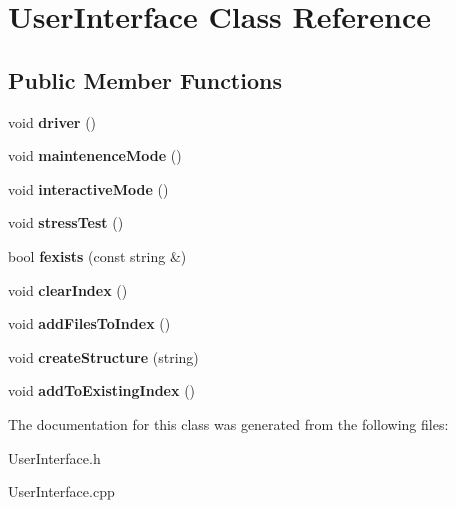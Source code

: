 \hypertarget{class_user_interface}{\section{User\+Interface Class Reference}
\label{class_user_interface}
}
\subsection*{Public Member Functions}
\begin{DoxyCompactItemize}
\item 
\hypertarget{class_user_interface_a5f668ba7e20441556650a2ab57919eb8}{void {\bfseries driver} ()}\label{class_user_interface_a5f668ba7e20441556650a2ab57919eb8}

\item 
\hypertarget{class_user_interface_aef424faaaab1a26e7e95615953dfb6b5}{void {\bfseries maintenence\+Mode} ()}\label{class_user_interface_aef424faaaab1a26e7e95615953dfb6b5}

\item 
\hypertarget{class_user_interface_a31406e8b5be6361c5e45f4f9b873c995}{void {\bfseries interactive\+Mode} ()}\label{class_user_interface_a31406e8b5be6361c5e45f4f9b873c995}

\item 
\hypertarget{class_user_interface_a0e9d6f1de4247604921f008ad8fd488b}{void {\bfseries stress\+Test} ()}\label{class_user_interface_a0e9d6f1de4247604921f008ad8fd488b}

\item 
\hypertarget{class_user_interface_a2b38e64d7c7cd64d09e8719ff747b244}{bool {\bfseries fexists} (const string \&)}\label{class_user_interface_a2b38e64d7c7cd64d09e8719ff747b244}

\item 
\hypertarget{class_user_interface_ac6235e19919c71faf514f82ae89b922f}{void {\bfseries clear\+Index} ()}\label{class_user_interface_ac6235e19919c71faf514f82ae89b922f}

\item 
\hypertarget{class_user_interface_a5aae71a73a68b9876c5ce7b1cba54910}{void {\bfseries add\+Files\+To\+Index} ()}\label{class_user_interface_a5aae71a73a68b9876c5ce7b1cba54910}

\item 
\hypertarget{class_user_interface_a6afb3103066951f4f3c69931cea544de}{void {\bfseries create\+Structure} (string)}\label{class_user_interface_a6afb3103066951f4f3c69931cea544de}

\item 
\hypertarget{class_user_interface_a141bf602a34bc9e85176bf05f3889ad2}{void {\bfseries add\+To\+Existing\+Index} ()}\label{class_user_interface_a141bf602a34bc9e85176bf05f3889ad2}

\end{DoxyCompactItemize}


The documentation for this class was generated from the following files\+:\begin{DoxyCompactItemize}
\item 
User\+Interface.\+h\item 
User\+Interface.\+cpp\end{DoxyCompactItemize}
